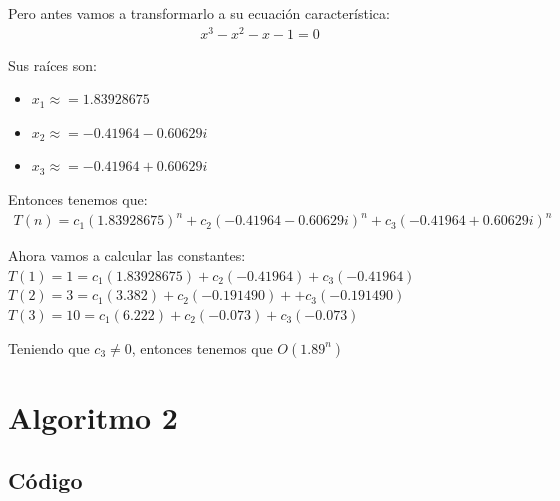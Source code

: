 \documentclass[12pt, fleqn]{article}                            %
\theoremstyle{break}                                            %
\begin{document}
        Pero antes vamos a transformarlo a su ecuación característica:
        \begin{align*}
            x^3 - x^2 - x - 1 = 0 
        \end{align*}

        Sus raíces son:
        \begin{itemize}
            \item $x_1 \approx = 1.83928675$
            \item $x_2 \approx = -0.41964 - 0.60629i$
            \item $x_3 \approx = -0.41964 + 0.60629i$
        \end{itemize}

        Entonces tenemos que:
        \begin{align*}
            T(n) = c_1(1.83928675)^n + c_2(-0.41964 - 0.60629i)^n + c_3(-0.41964 + 0.60629i)^n
        \end{align*}

        Ahora vamos a calcular las constantes:
        $T(1) = 1 = c_1(1.83928675) + c_2(-0.41964) + c_3(-0.41964)$
        $T(2) = 3 = c_1(3.382) + c_2(-0.191490) + + c_3(-0.191490)$
        $T(3) = 10 = c_1(6.222) + c_2(-0.073) + c_3(-0.073)$


        Teniendo que $c_3 \neq 0$, entonces tenemos que $O(1.89^n)$




\clearpage
\section{Algoritmo 2}


    \subsection{Código}

        

    \vspace{1em}
\end{document}

